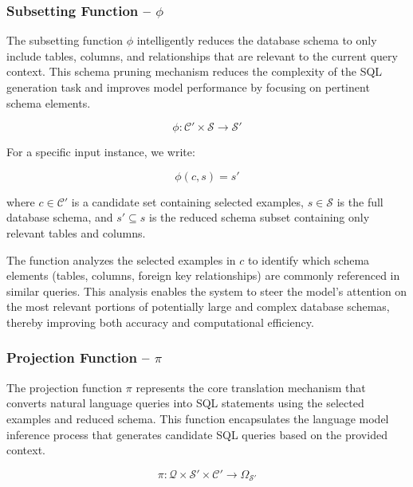 \subsubsection{Subsetting Function – $\phi$}\label{design:subsetting-function}

The subsetting function $\phi$ intelligently reduces the database schema to only include
tables, columns, and relationships that are relevant to the current query context.
This schema pruning mechanism reduces the complexity of the SQL generation task and
improves model performance by focusing on pertinent schema elements.

$$
\phi: \mathcal{C}' \times \mathcal{S} \rightarrow \mathcal{S}'
$$

\vspace{0.5em}

For a specific input instance, we write:

$$
\phi(c, s) = s'
$$

\vspace{0.5em}

where $c \in \mathcal{C}'$ is a candidate set containing selected examples, $s \in \mathcal{S}$
is the full database schema, and $s' \subseteq s$ is the reduced schema subset containing
only relevant tables and columns.

The function analyzes the selected examples in $c$ to identify which schema elements
(tables, columns, foreign key relationships) are commonly referenced in similar queries.
This analysis enables the system to steer the model's attention on the most relevant
portions of potentially large and complex database schemas, thereby improving both accuracy
and computational efficiency.

\subsubsection{Projection Function – $\pi$}\label{design:projection-function}

The projection function $\pi$ represents the core translation mechanism that converts
natural language queries into SQL statements using the selected examples and reduced schema.
This function encapsulates the language model inference process that generates candidate
SQL queries based on the provided context.

$$
\pi: \mathcal{Q} \times \mathcal{S}' \times \mathcal{C}' \rightarrow \Omega_{\mathcal{S}'}
$$

\vspace{0.5em}

